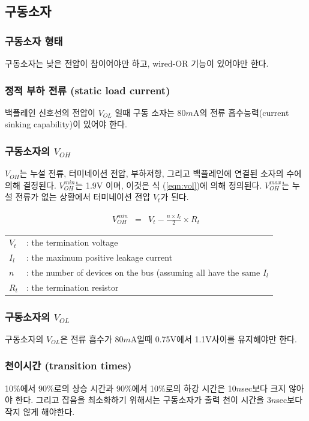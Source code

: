 \subsection{구동소자}
%
\subsubsection{구동소자 형태}
%
구동소자는 낮은 전압이 참이어야만 하고, wired-OR 기능이 있어야만 한다.

\subsubsection{정적 부하 전류 (static load current)}
%
백플레인 신호선의 전압이 $V_{OL}$ 일때 구동 소자는 80$m$A의 전류 흡수능력(current
sinking capability)이 있어야 한다.

\subsubsection{구동소자의 $V_{OH}$}\label{sec:voh}
%
$V_{OH}$는 누설 전류, 터미네이션 전압, 부하저항, 그리고 백플레인에 연결된 소자의 수에 의해
결정된다. $V_{OH}^{min}$는 1.9V 이며, 이것은 식 (\ref{eqn:vol})에 의해
정의된다. $V_{OH}^{max}$는 누설 전류가 없는 상황에서 터미네이션 전압 $V_t$가 된다.
%
\begin{table}[htb]
  \begin{eqnarray}
	V_{OH}^{min} & = & V_t - \frac{n \times I_l}{2}
		\times R_t \label{eqn:vol}
  \end{eqnarray}
%
   \begin{center}
   \begin{tabular}{ll}
	$V_t$ & : the termination voltage\\
	$I_l$ & : the maximum positive leakage current\\
	$n$   & : the number of devices on the bus
		(assuming all have the same $I_l$\\
	$R_t$ & : the termination resistor\\
   \end{tabular}
   \end{center}
\end{table}
%

\subsubsection{구동소자의 $V_{OL}$}
%
구동소자의 $V_{OL}$은 전류 흡수가 80$m$A일때 0.75V에서 1.1V사이를
유지해야만 한다.

\subsubsection{천이시간 (transition times)}
%
10\%에서 90\%로의 상승 시간과 90\%에서 10\%로의 하강 시간은 10$n$sec보다
크지 않아야 한다. 그리고 잡음을 최소화하기 위해서는 구동소자가 출력 천이 시간을 3$n$sec보다
작지 않게 해야한다.

